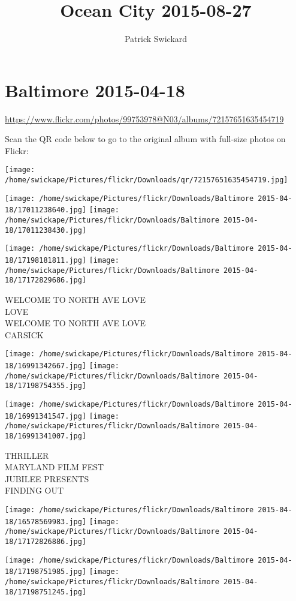 \documentclass[10pt,letterpaper]{article}
\title{Ocean City 2015-08-27}
\author{Patrick Swickard}
\date{}
\begin{document}
\section*{Baltimore 2015-04-18}

\url{https://www.flickr.com/photos/99753978@N03/albums/72157651635454719}

Scan the QR code below to go to the original album with full-size photos on Flickr:

\texttt{[image: /home/swickape/Pictures/flickr/Downloads/qr/72157651635454719.jpg]}
\pagebreak

\texttt{[image: /home/swickape/Pictures/flickr/Downloads/Baltimore 2015-04-18/17011238640.jpg]}
\texttt{[image: /home/swickape/Pictures/flickr/Downloads/Baltimore 2015-04-18/17011238430.jpg]}

\texttt{[image: /home/swickape/Pictures/flickr/Downloads/Baltimore 2015-04-18/17198181811.jpg]}
\texttt{[image: /home/swickape/Pictures/flickr/Downloads/Baltimore 2015-04-18/17172829686.jpg]}

WELCOME TO NORTH AVE LOVE\\
LOVE\\
WELCOME TO NORTH AVE LOVE\\
CARSICK
\pagebreak

\texttt{[image: /home/swickape/Pictures/flickr/Downloads/Baltimore 2015-04-18/16991342667.jpg]}
\texttt{[image: /home/swickape/Pictures/flickr/Downloads/Baltimore 2015-04-18/17198754355.jpg]}

\texttt{[image: /home/swickape/Pictures/flickr/Downloads/Baltimore 2015-04-18/16991341547.jpg]}
\texttt{[image: /home/swickape/Pictures/flickr/Downloads/Baltimore 2015-04-18/16991341007.jpg]}

THRILLER\\
MARYLAND FILM FEST\\
JUBILEE PRESENTS\\
FINDING OUT
\pagebreak

\texttt{[image: /home/swickape/Pictures/flickr/Downloads/Baltimore 2015-04-18/16578569983.jpg]}
\texttt{[image: /home/swickape/Pictures/flickr/Downloads/Baltimore 2015-04-18/17172826886.jpg]}

\texttt{[image: /home/swickape/Pictures/flickr/Downloads/Baltimore 2015-04-18/17198751985.jpg]}
\texttt{[image: /home/swickape/Pictures/flickr/Downloads/Baltimore 2015-04-18/17198751245.jpg]}
\end{document}
